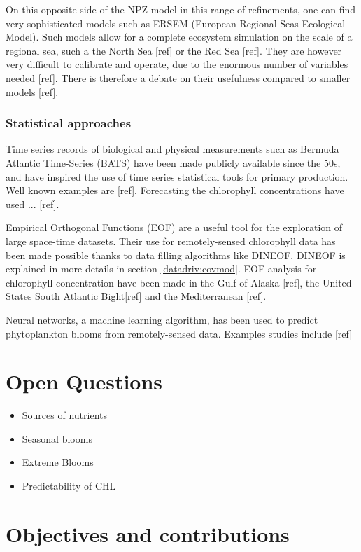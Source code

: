 			On this opposite side of the NPZ model in this range of refinements, one can find very sophisticated models such as ERSEM (European Regional Seas Ecological Model). Such models allow for a complete ecosystem simulation on the scale of a regional sea, such a the North Sea [ref] or the Red Sea [ref]. They are however very difficult to calibrate and operate, due to the enormous number of variables needed [ref]. There is therefore a debate on their usefulness compared to smaller models [ref]. 

		\subsubsection{Statistical approaches}

			Time series records of biological and physical measurements such as Bermuda Atlantic Time-Series (BATS) have been made publicly available since the 50s, and have inspired the use of time series statistical tools for primary production. Well known examples are [ref]. Forecasting the chlorophyll concentrations have used ... [ref].

			Empirical Orthogonal Functions (EOF) are a useful tool for the exploration of large space-time datasets. Their use for remotely-sensed chlorophyll data has been made possible thanks to data filling algorithms like DINEOF. DINEOF is explained in more details in section \ref{datadriv:covmod}. EOF analysis for chlorophyll concentration have been made in the Gulf of Alaska [ref], the United States South Atlantic Bight[ref] and the Mediterranean [ref].

			Neural networks, a machine learning algorithm, has been used to predict phytoplankton blooms from remotely-sensed data. Examples studies include [ref]

\section{Open Questions}
\label{intro:questions}

	\begin{itemize}
		\item Sources of nutrients
		\item Seasonal blooms
		\item Extreme Blooms
		\item Predictability of CHL
	\end{itemize}

\section{Objectives and contributions}
\label{intro:objectives}

